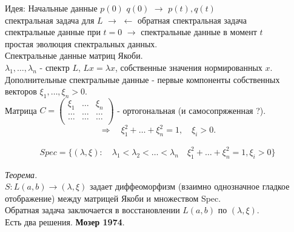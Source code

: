 \documentclass[a4paper,12pt]{article}
\theoremstyle{definition}
\theoremstyle{definition}
\theoremstyle{definition}
\newcommand{\bear}[1]{\begin{eqnarray}\label{#1}}
\newcommand{\ear}{\end{eqnarray}}
\begin{document}
Идея: Начальные данные $p(0)$ $q(0)$ $\longrightarrow$ $p(t),q(t)$\\
спектральная задача для $L$ $\longrightarrow$ $\longleftarrow$ обратная спектральная задача\\
спектральные данные при $t = 0$ $\longrightarrow$ спектральные данные в момент $t$\\
простая  эволюция спектральных данных.\\

Спектральные данные матриц Якоби.\\

$\lambda_{1},\ldots ,\lambda_{n}$ - спектр $L$, $Lx=\lambda x$, собственные значения нормированных $x$.\\
Дополнительные спектральные данные - первые компоненты собственных векторов $\xi_{1},\ldots,\xi_{n}>0$.\\
Матрица $C = \left(
               \begin{array}{ccc}
                 \xi_{1} & \ldots & \xi_{n} \\
                 \ldots & \ldots & \ldots \\
                 \ldots & \ldots & \ldots \\
               \end{array}
             \right)$ - ортогональная (и самосопряженная ?).\\

\[\Rightarrow\quad \xi^{2}_{1} + \ldots + \xi^{2}_{n} = 1,\quad \xi_{i} >0.\]

\bear{Spectr}
Spec = \{(\lambda,\xi): \quad \lambda_{1}<\lambda_{2}<\ldots<\lambda_{n} \quad \xi^{2}_{1} + \ldots + \xi^{2}_{n} = 1, \xi_{i} >0\}
\ear

\textit{Теорема.}\\


$S : L(a,b) \rightarrow (\lambda, \xi)$ задает диффеоморфизм  (взаимно однозначное гладкое отображение) между матрицей Якоби и множеством Spec.\\

Обратная задача заключается в восстановлении $L(a,b)$ по $(\lambda, \xi)$.\\
Есть два решения. \textbf{Мозер 1974}.\\
\end{document}
